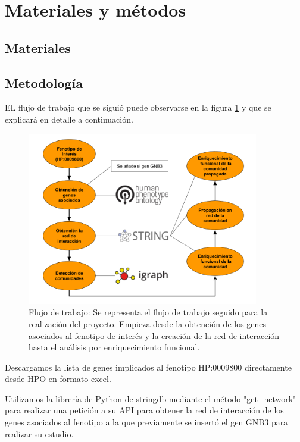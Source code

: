 \section{Materiales y métodos}

\subsection{Materiales}

\subsection{Metodología}

EL flujo de trabajo que se siguió puede observarse en la figura \ref{fig:workflow} y que se explicará en detalle a continuación.

\begin{figure}[h!]
	\includegraphics[width=0.9\textwidth]{figures/workflow.png}
	\caption{Flujo de trabajo: Se representa el flujo de trabajo seguido para la realización del proyecto. Empieza desde la obtención de los genes asociados al fenotipo de interés y la creación de la red de interacción hasta el análisis por enriquecimiento funcional.}
	\label{fig:workflow}
\end{figure}

Descargamos la lista de genes implicados al fenotipo HP:0009800 directamente desde HPO en formato excel.

Utilizamos la librería de Python de stringdb mediante el método "get\_network" para realizar una petición a su API para obtener la red de interacción de los genes asociados al fenotipo a la que previamente se insertó el gen GNB3 para realizar su estudio.

